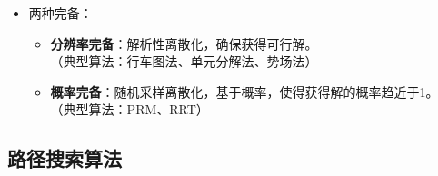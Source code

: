 \documentclass[../main.tex]{subfiles}
\begin{document}
\begin{enumerate}
\begin{itemize}
        \item {两种完备}：
            \begin{itemize}
                \item \textbf{分辨率完备}：解析性离散化，确保获得可行解。
                \\{\small\kaishu （典型算法：行车图法、单元分解法、势场法）}
                \item \textbf{概率完备}：随机采样离散化，基于概率，使得获得解的概率趋近于1。
                \\{\small\kaishu （典型算法：PRM、RRT）}
            \end{itemize}
    \end{itemize}
\end{enumerate}

\subsection{路径搜索算法}\label{subsec:path_search}
\end{document}
